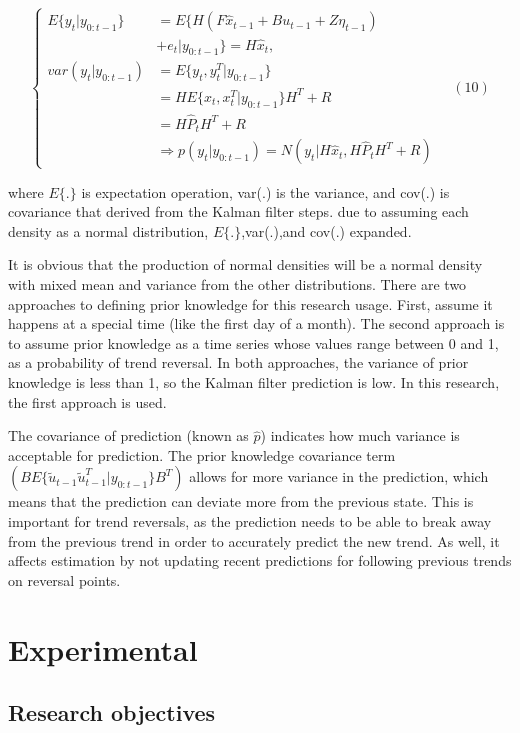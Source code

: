 \documentclass[12pt,a4paper]{article}
\begin{document}
	\begin{equation}
		\left\{ \begin{array}{ll}E\{y_t|y_{0:t - 1}\} & = E\{H(F\hat{x}_{t - 1} + Bu_{t - 1} + Z\eta_{t - 1})\\
			& +e_t|y_{0:t - 1}\} = H\hat{x}_t,\\
			var(y_t|y_{0:t - 1}) & = E\{y_t,y_t^T|y_{0:t - 1}\} \\
			& = HE\{x_t,x_t^T|y_{0:t - 1}\} H^T +R\\
			& = H\hat{P}_tH^T +R\\
			& \Rightarrow p(y_t|y_{0:t - 1}) = N(y_t|H\hat{x}_t,H\hat{P}_tH^T +R) \end{array} \right. \quad (10)
	\end{equation}
	
	where \(E\{.\}\) is expectation operation, var(.) is the variance, and cov(.) is covariance that derived from the Kalman filter steps. due to assuming each density as a normal distribution, \(E\{.\}\),var(.),and cov(.) expanded.
	
	It is obvious that the production of normal densities will be a normal density with mixed mean and variance from the other distributions. There are two approaches to defining prior knowledge for this research usage. First, assume it happens at a special time (like the first day of a month). The second approach is to assume prior knowledge as a time series whose values range between 0 and 1, as a probability of trend reversal. In both approaches, the variance of prior knowledge is less than 1, so the Kalman filter prediction is low. In this research, the first approach is used.
	
	The covariance of prediction (known as \(\hat{p}\)) indicates how much variance is acceptable for prediction. The prior knowledge covariance term \(\left(BE\{\tilde{u}_{t - 1}\tilde{u}_{t - 1}^T |y_{0:t - 1}\} B^T\right)\) allows for more variance in the prediction, which means that the prediction can deviate more from the previous state. This is important for trend reversals, as the prediction needs to be able to break away from the previous trend in order to accurately predict the new trend. As well, it affects estimation by not updating recent predictions for following previous trends on reversal points.
	
	\section{Experimental}
	
	\subsection{Research objectives}
	
\end{document}

